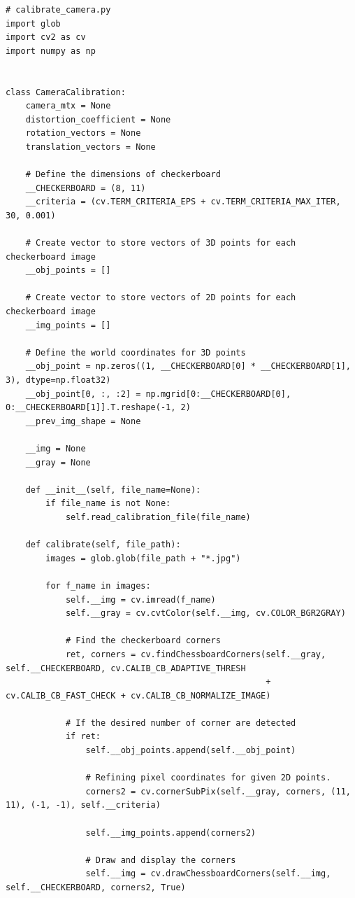 \documentclass[a4paper, 12pt]{article}
\begin{document}
	\begin{lstlisting}
# calibrate_camera.py
import glob
import cv2 as cv
import numpy as np


class CameraCalibration:
    camera_mtx = None
    distortion_coefficient = None
    rotation_vectors = None
    translation_vectors = None

    # Define the dimensions of checkerboard
    __CHECKERBOARD = (8, 11)
    __criteria = (cv.TERM_CRITERIA_EPS + cv.TERM_CRITERIA_MAX_ITER, 30, 0.001)

    # Create vector to store vectors of 3D points for each checkerboard image
    __obj_points = []

    # Create vector to store vectors of 2D points for each checkerboard image
    __img_points = []

    # Define the world coordinates for 3D points
    __obj_point = np.zeros((1, __CHECKERBOARD[0] * __CHECKERBOARD[1], 3), dtype=np.float32)
    __obj_point[0, :, :2] = np.mgrid[0:__CHECKERBOARD[0], 0:__CHECKERBOARD[1]].T.reshape(-1, 2)
    __prev_img_shape = None

    __img = None
    __gray = None

    def __init__(self, file_name=None):
        if file_name is not None:
            self.read_calibration_file(file_name)

    def calibrate(self, file_path):
        images = glob.glob(file_path + "*.jpg")

        for f_name in images:
            self.__img = cv.imread(f_name)
            self.__gray = cv.cvtColor(self.__img, cv.COLOR_BGR2GRAY)

            # Find the checkerboard corners
            ret, corners = cv.findChessboardCorners(self.__gray, self.__CHECKERBOARD, cv.CALIB_CB_ADAPTIVE_THRESH
                                                    + cv.CALIB_CB_FAST_CHECK + cv.CALIB_CB_NORMALIZE_IMAGE)

            # If the desired number of corner are detected
            if ret:
                self.__obj_points.append(self.__obj_point)

                # Refining pixel coordinates for given 2D points.
                corners2 = cv.cornerSubPix(self.__gray, corners, (11, 11), (-1, -1), self.__criteria)

                self.__img_points.append(corners2)

                # Draw and display the corners
                self.__img = cv.drawChessboardCorners(self.__img, self.__CHECKERBOARD, corners2, True)


\end{lstlisting}
\end{document}

